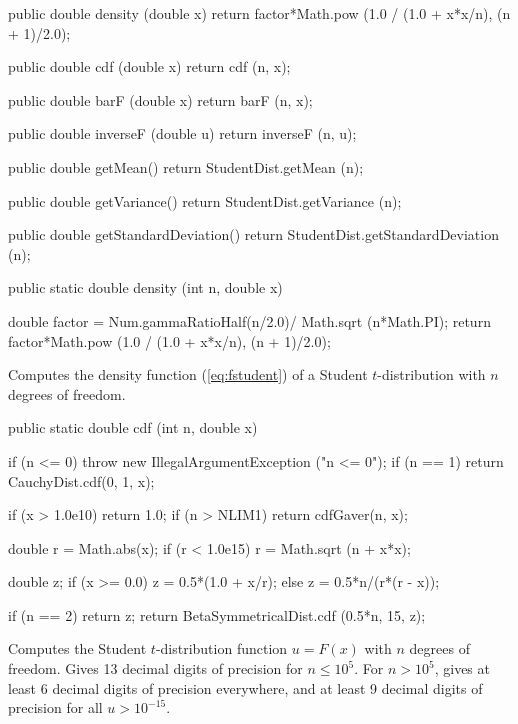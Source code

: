 \begin{code}\begin{hide}

   public double density (double x) {
      return factor*Math.pow (1.0 / (1.0 + x*x/n), (n + 1)/2.0);
   }

   public double cdf (double x) {
      return cdf (n, x);
   }

   public double barF (double x) {
      return barF (n, x);
   }

   public double inverseF (double u) {
      return inverseF (n, u);
   }

   public double getMean() {
      return StudentDist.getMean (n);
   }

   public double getVariance() {
      return StudentDist.getVariance (n);
   }

   public double getStandardDeviation() {
      return StudentDist.getStandardDeviation (n);
   }\end{hide}

   public static double density (int n, double x)\begin{hide} {
      double factor = Num.gammaRatioHalf(n/2.0)/ Math.sqrt (n*Math.PI);
      return factor*Math.pow (1.0 / (1.0 + x*x/n), (n + 1)/2.0);
   }\end{hide}
\end{code}
\begin{tabb} Computes the density function (\ref{eq:fstudent}) of a
   Student $t$-distribution with $n$ degrees of freedom.
\end{tabb}
\begin{code}

   public static double cdf (int n, double x)\begin{hide} {
      if (n <= 0)
        throw new IllegalArgumentException ("n <= 0");
      if (n == 1)
         return CauchyDist.cdf(0, 1, x);

      if (x > 1.0e10)
         return 1.0;
      if (n > NLIM1)
         return cdfGaver(n, x);

      double r = Math.abs(x);
      if (r < 1.0e15)
         r = Math.sqrt (n + x*x);

      double z;
      if (x >= 0.0)
         z = 0.5*(1.0 + x/r);
      else
         z = 0.5*n/(r*(r - x));

      if (n == 2)
         return z;
      return BetaSymmetricalDist.cdf (0.5*n, 15, z);
   }\end{hide}
\end{code}
  \begin{tabb}
  Computes the Student $t$-distribution function $u=F(x)$ with $n$ degrees of freedom.
  Gives 13 decimal digits of precision for $n \le 10^5$.
 For $n >  10^5$, gives  at least 6 decimal digits of precision everywhere, and
 at least 9 decimal digits of precision for all $u >  10^{-15}$.
  \end{tabb}
